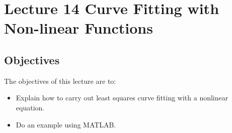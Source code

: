 \chapter{Lecture 14 Curve Fitting with Non-linear Functions}
\label{ch:lec14n}
\section{Objectives}
The objectives of this lecture are to:
\begin{itemize}
\item Explain how to carry out least squares curve fitting with a nonlinear equation.
\item Do an example using MATLAB.
\end{itemize}
\setcounter{lstannotation}{0}
